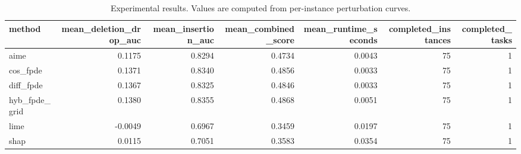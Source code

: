 \begin{table}[t]
\caption{Experimental results. Values are computed from per-instance perturbation curves.}
\label{tab:main_results_computed}
\centering
\begin{tabular}{lrrrrrr}
\toprule
method & mean\_deletion\_drop\_auc & mean\_insertion\_auc & mean\_combined\_score & mean\_runtime\_seconds & completed\_instances & completed\_tasks \\
\midrule
aime & 0.1175 & 0.8294 & 0.4734 & 0.0043 & 75 & 1 \\
cos\_fpde & 0.1371 & 0.8340 & 0.4856 & 0.0033 & 75 & 1 \\
diff\_fpde & 0.1367 & 0.8325 & 0.4846 & 0.0033 & 75 & 1 \\
hyb\_fpde\_grid & 0.1380 & 0.8355 & 0.4868 & 0.0051 & 75 & 1 \\
lime & -0.0049 & 0.6967 & 0.3459 & 0.0197 & 75 & 1 \\
shap & 0.0115 & 0.7051 & 0.3583 & 0.0354 & 75 & 1 \\
\bottomrule
\end{tabular}

\end{table}
